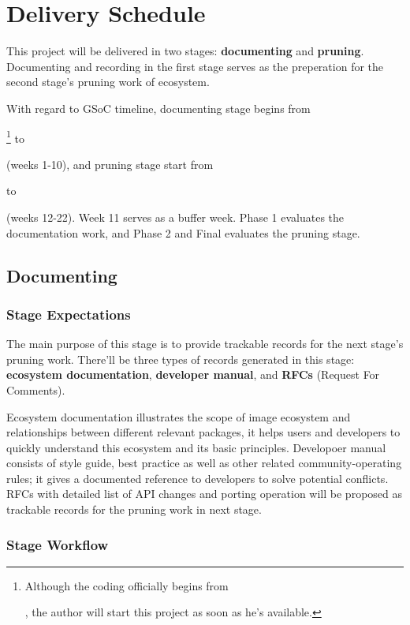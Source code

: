 
\section{Delivery Schedule}\label{sec:delivery}

This project will be delivered in two stages: \textbf{documenting} and \textbf{pruning}. Documenting and recording in the first stage serves as the preperation for the second stage's pruning work of \images{} ecosystem.\par

With regard to GSoC timeline, documenting stage begins from \date{April 22}\footnote{Although the coding officially begins from \date{May 27}, the author will start this project as soon as he's available.} to \date{June 24} (weeks 1-10), and pruning stage start from \date{July 1} to \date{August 26} (weeks 12-22). Week 11 serves as a buffer week. \textsf{Phase 1} evaluates the documentation work, and \textsf{Phase 2} and \textsf{Final} evaluates the pruning stage.

\subsection{Documenting}\label{subsec:documentation}

\subsubsection*{Stage Expectations}

The main purpose of this stage is to provide trackable records for the next stage's pruning work. There'll be three types of records generated in this stage: \textbf{ecosystem documentation}, \textbf{developer manual}, and \textbf{RFCs} (Request For Comments). \par

Ecosystem documentation illustrates the scope of image ecosystem and relationships between different relevant packages, it helps users and developers to quickly understand this ecosystem and its basic principles. Developoer manual consists of style guide, best practice as well as other related community-operating rules; it gives a documented reference to developers to solve potential conflicts. RFCs with detailed list of API changes and porting operation will be proposed as trackable records for the pruning work in next stage. \par

\subsubsection*{Stage Workflow}

